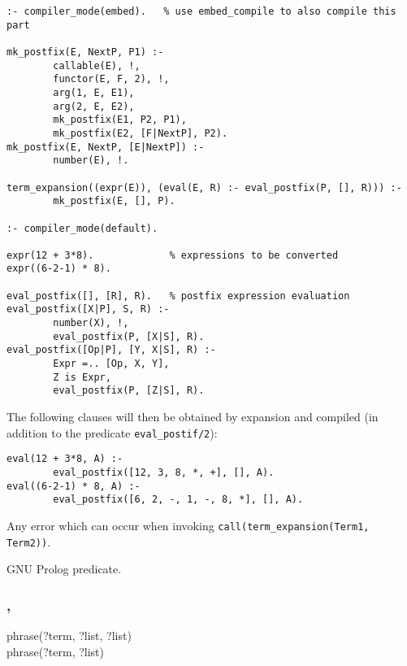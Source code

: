 \begin{Code}
\begin{verbatim}
:- compiler_mode(embed).   % use embed_compile to also compile this part

mk_postfix(E, NextP, P1) :-
        callable(E), !,
        functor(E, F, 2), !,
        arg(1, E, E1),
        arg(2, E, E2),
        mk_postfix(E1, P2, P1),
        mk_postfix(E2, [F|NextP], P2).
mk_postfix(E, NextP, [E|NextP]) :-
        number(E), !.

term_expansion((expr(E)), (eval(E, R) :- eval_postfix(P, [], R))) :-
        mk_postfix(E, [], P).

:- compiler_mode(default).

expr(12 + 3*8).             % expressions to be converted
expr((6-2-1) * 8).

eval_postfix([], [R], R).   % postfix expression evaluation
eval_postfix([X|P], S, R) :-
        number(X), !,
        eval_postfix(P, [X|S], R).
eval_postfix([Op|P], [Y, X|S], R) :-
        Expr =.. [Op, X, Y],
        Z is Expr,
        eval_postfix(P, [Z|S], R).
\end{verbatim}
\end{Code}

The following clauses will then be obtained by expansion and compiled (in addition to the
predicate \texttt{eval\_postif/2}):

\begin{Code}
\begin{verbatim}
eval(12 + 3*8, A) :-
        eval_postfix([12, 3, 8, *, +], [], A).
eval((6-2-1) * 8, A) :-
        eval_postfix([6, 2, -, 1, -, 8, *], [], A).
\end{verbatim}
\end{Code}

\Errors

Any error which can occur when invoking \texttt{call(term\_expansion(Term1,
  Term2))}.

\Portability

GNU Prolog predicate.

\subsubsection{,
               }

\begin{TemplatesOneCol}
phrase(?term, ?list, ?list)\\
phrase(?term, ?list)

\end{TemplatesOneCol}

